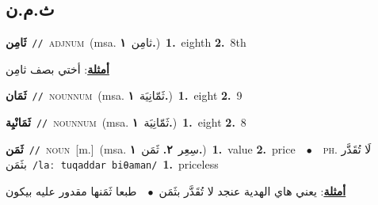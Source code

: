 \documentclass[10pt,a4paper,twoside]{article} %
\begin{document}
\begin{multicols}{2}
{{{{{{{{{{{\vspace{-3mm}
\subsection*{\color{blue}\foreignlanguage{arabic}{ث.م.ن}\color{blue}{}} 

{\setlength\topsep{0pt}\textbf{\foreignlanguage{arabic}{ثَامِن}}\ {\color{gray}\texttt{//}\color{black}}\ \textsc{adj\textunderscore num}\ \color{gray}(msa. \foreignlanguage{arabic}{ثامِن}~\foreignlanguage{arabic}{\textbf{١.}})\color{black}\ \textbf{1.}~eighth  \textbf{2.}~8th\  \begin{flushright}\color{gray}\foreignlanguage{arabic}{\textbf{\underline{\foreignlanguage{arabic}{أمثلة}}}: أختي بصف ثامِن}\end{flushright}\color{black}} \vspace{2mm}

{\setlength\topsep{0pt}\textbf{\foreignlanguage{arabic}{ثَمَان}}\ {\color{gray}\texttt{//}\color{black}}\ \textsc{noun\textunderscore num}\ \color{gray}(msa. \foreignlanguage{arabic}{ثَمّانِيَة}~\foreignlanguage{arabic}{\textbf{١.}})\color{black}\ \textbf{1.}~eight  \textbf{2.}~9\ 

{\setlength\topsep{0pt}\textbf{\foreignlanguage{arabic}{ثَمَانْيِة}}\ {\color{gray}\texttt{//}\color{black}}\ \textsc{noun\textunderscore num}\ \color{gray}(msa. \foreignlanguage{arabic}{ثَمّانِيَة}~\foreignlanguage{arabic}{\textbf{١.}})\color{black}\ \textbf{1.}~eight  \textbf{2.}~8\ 

{\setlength\topsep{0pt}\textbf{\foreignlanguage{arabic}{ثَمَن}}\ {\color{gray}\texttt{//}\color{black}}\ \textsc{noun}\ [m.]\ \color{gray}(msa. \foreignlanguage{arabic}{سِعِر}~\foreignlanguage{arabic}{\textbf{٢.}}  \foreignlanguage{arabic}{ثَمَن}~\foreignlanguage{arabic}{\textbf{١.}})\color{black}\ \textbf{1.}~value  \textbf{2.}~price\ \ $\bullet$\ \ \textsc{ph.} \color{gray} \foreignlanguage{arabic}{لَا تُقَدَّر بثَمَن}\color{black}\ {\color{gray}\texttt{/{\sffamily laː tuqaddar biθaman}/}\color{black}}\ \textbf{1.}~priceless\  \begin{flushright}\color{gray}\foreignlanguage{arabic}{\textbf{\underline{\foreignlanguage{arabic}{أمثلة}}}: يعني هاي الهدية عنجد لا تُقَدَّر بثَمَن\ $\bullet$\ \  طبعا ثَمَنها مقدور عليه بيكون}\end{flushright}\color{black}} \vspace{2mm}

}}}}}}}}}}}}}
\end{multicols}
\end{document}
